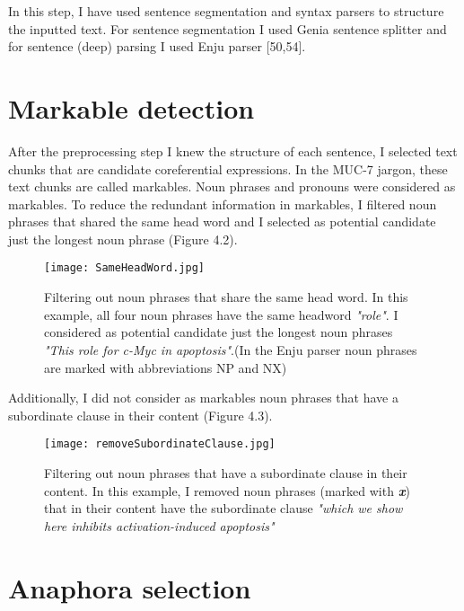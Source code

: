 In this step, I have used sentence segmentation and syntax parsers to structure the inputted text. For sentence segmentation I used Genia sentence splitter and for sentence (deep) parsing I used Enju parser [50,54].

\section{Markable detection}

After the preprocessing step I knew the structure of each sentence, I selected text chunks that are candidate coreferential expressions. In the MUC-7 jargon, these text chunks are called markables. Noun phrases and pronouns were considered as markables. To reduce the redundant information in markables, I filtered noun phrases that shared the same head word and I selected as potential candidate just the longest noun phrase (Figure 4.2). 

\begin{figure}[h]
	\begin{center}
		\texttt{[image: SameHeadWord.jpg]} 
 		\caption[Filtering out noun phrases that share the same head word]{ Filtering out noun phrases that share the same head word. In this example, all four noun phrases have the same headword \emph{"role"}. I considered as potential candidate just the longest noun phrases \emph{"This role for c-Myc in apoptosis"}.(In the Enju parser noun phrases are marked with abbreviations NP and NX) }
		\label{Figure 9}
	\end{center}
\end{figure}

Additionally, I did not consider as markables noun phrases that have a subordinate clause in their content (Figure 4.3).

\begin{figure}[h]
	\begin{center}
		\texttt{[image: removeSubordinateClause.jpg]} 
 		\caption[Filtering out noun phrases that have a subordinate clause in their content]{ Filtering out noun phrases that have a subordinate clause in their content. In this example, I removed noun phrases (marked with \emph{\textbf{x}}) that in their content have the subordinate clause  \emph{"which we show here inhibits activation-induced apoptosis"} }
		\label{Figure 10}
	\end{center}
\end{figure}

\section{Anaphora selection}

